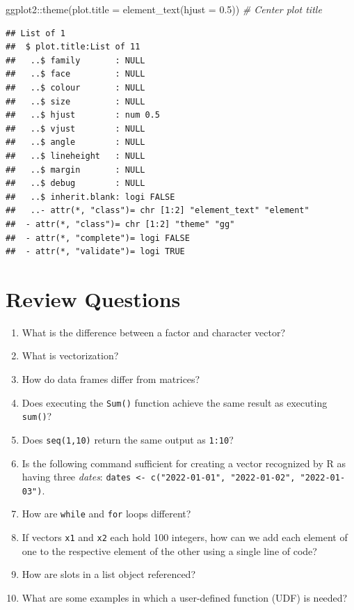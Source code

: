 \documentclass[
]{book}
\newenvironment{Shaded}{\begin{snugshade}}{\end{snugshade}}
\newcommand{\AttributeTok}[1]{\textcolor[rgb]{0.77,0.63,0.00}{#1}}
\newcommand{\CommentTok}[1]{\textcolor[rgb]{0.56,0.35,0.01}{\textit{#1}}}
\newcommand{\FloatTok}[1]{\textcolor[rgb]{0.00,0.00,0.81}{#1}}
\newcommand{\FunctionTok}[1]{\textcolor[rgb]{0.00,0.00,0.00}{#1}}
\newcommand{\NormalTok}[1]{#1}
\newcommand{\SpecialCharTok}[1]{\textcolor[rgb]{0.00,0.00,0.00}{#1}}
\begin{document}
\begin{Shaded}
\begin{Highlighting}[]
\NormalTok{ggplot2}\SpecialCharTok{::}\FunctionTok{theme}\NormalTok{(}\AttributeTok{plot.title =} \FunctionTok{element\_text}\NormalTok{(}\AttributeTok{hjust =} \FloatTok{0.5}\NormalTok{)) }\CommentTok{\# Center plot title}
\end{Highlighting}
\end{Shaded}

\begin{verbatim}
## List of 1
##  $ plot.title:List of 11
##   ..$ family       : NULL
##   ..$ face         : NULL
##   ..$ colour       : NULL
##   ..$ size         : NULL
##   ..$ hjust        : num 0.5
##   ..$ vjust        : NULL
##   ..$ angle        : NULL
##   ..$ lineheight   : NULL
##   ..$ margin       : NULL
##   ..$ debug        : NULL
##   ..$ inherit.blank: logi FALSE
##   ..- attr(*, "class")= chr [1:2] "element_text" "element"
##  - attr(*, "class")= chr [1:2] "theme" "gg"
##  - attr(*, "complete")= logi FALSE
##  - attr(*, "validate")= logi TRUE
\end{verbatim}

\hypertarget{review-questions}{%
\section{Review Questions}\label{review-questions}}

\begin{enumerate}
\def\labelenumi{\arabic{enumi}.}
\item
  What is the difference between a factor and character vector?
\item
  What is vectorization?
\item
  How do data frames differ from matrices?
\item
  Does executing the \texttt{Sum()} function achieve the same result as executing \texttt{sum()}?
\item
  Does \texttt{seq(1,10)} return the same output as \texttt{1:10}?
\item
  Is the following command sufficient for creating a vector recognized by R as having three \emph{dates}: \texttt{dates\ \textless{}-\ c("2022-01-01",\ "2022-01-02",\ "2022-01-03")}.
\item
  How are \texttt{while} and \texttt{for} loops different?
\item
  If vectors \texttt{x1} and \texttt{x2} each hold 100 integers, how can we add each element of one to the respective element of the other using a single line of code?
\item
  How are slots in a list object referenced?
\item
  What are some examples in which a user-defined function (UDF) is needed?
\end{enumerate}
\end{document}
